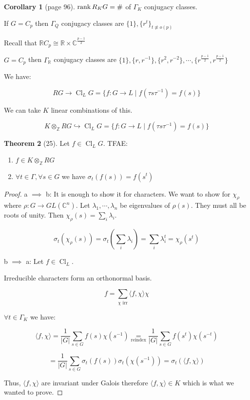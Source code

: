 \documentclass{article}
\theoremstyle{definition}
\newtheorem{theorem}{Theorem}
\newtheorem{corollary}[theorem]{Corollary}
\begin{document}
\begin{corollary}
    [page 96]

    \(\rank R_K G = \#\) of \(\Gamma_K\) conjugacy classes. 
\end{corollary}

If \(G = C_p\) then \(\Gamma_Q\) conjugacy classes are \(\{ 1 \}, \{ r^t \}_{t\not\equiv o(p)}\)

Recall that \(\mathbb{R} C_p \cong \mathbb{R} \times \mathbb{C}^{\frac{p-1}{2}}\)

\(G = C_p\) then \(\Gamma_\mathbb{R}\) conjugacy classes are \(\{ 1 \}, \{ r, r ^{-1} \}, \{ r^2, r^{-2} \}, \cdots ,\{ r^{\frac{p-1}{2}}, r^{ \frac{p-1}{2} } \} \) 

We have:

\[
    R G \to \operatorname{Cl}_L G = \{ f: G \to L \mid f(\tau s \tau ^{-1}) = f(s) \}
\]

We can take \(K\) linear combinations of this.

\[
    K \otimes_\mathbb{Z} R G \hookrightarrow \operatorname{Cl}_L G = \{ f: G \to L \mid f(\tau s \tau ^{-1}) = f(s) \}
\]

\begin{theorem}
    [25] Let \(f\in \operatorname{Cl}_L G\). TFAE:

    \begin{enumerate}[label=\alph*)]
        \item \(f\in K \otimes_\mathbb{Z} RG\) 
        \item \(\forall t \in \Gamma, \forall s\in G\) we have \(\sigma_t (f(s)) = f(s^t)\)  
    \end{enumerate} 
\end{theorem}

\begin{proof}
    a \(\implies\) b: It is enough to show it for characters. We want to show for \(\chi_{\rho}\) where \(\rho: G \to GL(\mathbb{C}^n)\). Let \(\lambda_1, \cdots , \lambda_n\) be eigenvalues of \(\rho(s)\). They must all be roots of unity. Then \(\chi_{\rho} (s) = \sum_{i} \lambda_i\).

    \[
        \sigma_t (\chi_{\rho} (s)) = \sigma_t \left(\sum_{i} \lambda_{i}\right) = \sum_{i} \lambda_i ^ t = \chi_{\rho} (s^t)
    \]

    b \(\implies\) a: Let \(f\in \operatorname{Cl}_L\).

    Irreducible characters form an orthonormal basis.

    \[
        f = \sum_{\chi \text{ irr}} \langle f, \chi \rangle \chi
    \]

    \(\forall t \in \Gamma_K\) we have:

    \[
        \langle f, \chi \rangle = \frac{1}{\vert G \vert}\sum_{s\in G} f(s) \chi(s ^{-1}) \underset{\text{reindex}}{=}  \frac{1}{\vert G \vert}\sum_{s\in G} f(s^t) \chi(s^{-t})
    \]
    
    \[
        = \frac{1}{\vert G \vert}\sum_{s\in G} \sigma_t(f(s)) \sigma_t (\chi (s ^{-1})) = \sigma_t(\langle f, \chi \rangle)
    \]

    Thus, \(\langle f, \chi \rangle\) are invariant under Galois therefore \(\langle f, \chi \rangle \in K\) which is what we wanted to prove.
\end{proof}
\end{document}
